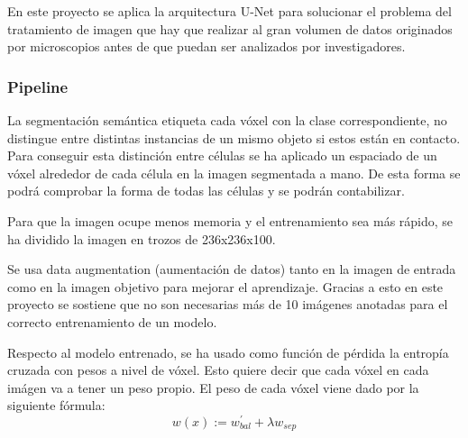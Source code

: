 En este proyecto se aplica la arquitectura U-Net para solucionar el problema del tratamiento de imagen que hay que realizar al gran volumen de datos originados por microscopios antes de que puedan ser analizados por investigadores.

\subsubsection{Pipeline}


La segmentación semántica etiqueta cada vóxel con la clase correspondiente, no distingue entre distintas instancias de un mismo objeto si estos están en contacto. Para conseguir esta distinción entre células se ha aplicado un espaciado de un vóxel alrededor de cada célula en la imagen segmentada a mano. De esta forma se podrá comprobar la forma de todas las células y se podrán contabilizar.

Para que la imagen ocupe menos memoria y el entrenamiento sea más rápido, se ha dividido la imagen en trozos de 236x236x100. 

Se usa data augmentation (aumentación de datos) tanto en la imagen de entrada como en la imagen objetivo para mejorar el aprendizaje. Gracias a esto en este proyecto se sostiene que no son necesarias más de 10 imágenes anotadas para el correcto entrenamiento de un modelo.

Respecto al modelo entrenado, se ha usado como función de pérdida la entropía cruzada con pesos a nivel de vóxel. Esto quiere decir que cada vóxel en cada imágen va a tener un peso propio. El peso de cada vóxel viene dado por la siguiente fórmula:
\begin{equation}
w(x):=w^{'}_{bal}+\lambda w_{sep}
\end{equation}

